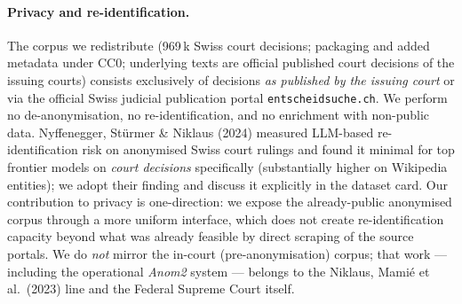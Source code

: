 \documentclass[11pt,a4paper]{article}
\begin{document}
\paragraph{Privacy and re-identification.}
The corpus we redistribute (969\,k Swiss court decisions; packaging
and added metadata under CC0; underlying texts are official
published court decisions of the issuing courts) consists
exclusively of decisions \emph{as published by the issuing court}
or via the official Swiss judicial publication portal
\texttt{entscheidsuche.ch}.  We perform no de-anonymisation, no
re-identification, and no enrichment with non-public data.
Nyffenegger, St{\"u}rmer \& Niklaus (2024) measured LLM-based
re-identification risk on anonymised Swiss court rulings and found
it minimal for top frontier models on \emph{court decisions}
specifically (substantially higher on Wikipedia entities); we
adopt their finding and discuss it explicitly in the dataset card.
Our contribution to privacy is one-direction: we expose the
already-public anonymised corpus through a more uniform interface,
which does not create re-identification capacity beyond what was
already feasible by direct scraping of the source portals.  We do
\emph{not} mirror the in-court (pre-anonymisation) corpus; that
work --- including the operational \emph{Anom2} system --- belongs
to the Niklaus, Mami{\'e} et al.\ (2023) line and the Federal
Supreme Court itself.
\end{document}
